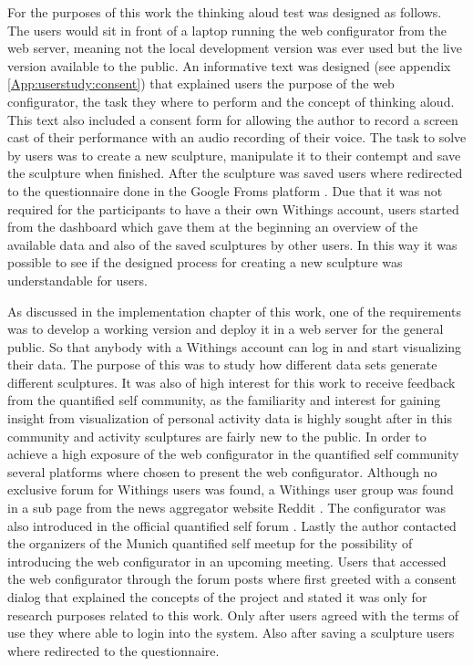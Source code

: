 \documentclass[../medieninformatik-arbeit.tex]{subfiles}
\begin{document}
For the purposes of this work the thinking aloud test was designed as follows. The users would sit in front of a laptop running the web configurator from the web server, meaning not the local development version was ever used but the live version available to the public. An informative text was designed (see appendix \ref{App:userstudy:consent}) that explained users the purpose of the web configurator, the task they where to perform and the concept of thinking aloud. This text also included a consent form for allowing the author to record a screen cast of their performance with an audio recording of their voice. The task to solve by users was to create a new sculpture, manipulate it to their contempt and save the sculpture when finished. After the sculpture was saved users where redirected to the questionnaire done in the Google Froms platform \cite{googleforms}. Due that it was not required for the participants to have a their own Withings account, users started from the dashboard which gave them at the beginning an overview of the available data and also of the saved sculptures by other users. In this way it was possible to see if the designed process for creating a new sculpture was understandable for users. 

As discussed in the implementation chapter of this work, one of the requirements was to develop a working version and deploy it in a web server for the general public. So that anybody with a Withings account can log in and start visualizing their data. The purpose of this was to study how different data sets generate different sculptures. It was also of high interest for this work to receive feedback from the quantified self community, as the familiarity and interest for gaining insight from visualization of personal activity data is highly sought after in this community and activity sculptures are fairly new to the public. In order to achieve a high exposure of the web configurator in the quantified self community several platforms where chosen to present the web configurator. Although no exclusive forum for Withings users was found, a Withings user group was found in a sub page from the news aggregator website Reddit \cite{redditwithings}. The configurator was also introduced in the official quantified self forum \cite{qfselfforum}. Lastly the author contacted the organizers of the Munich quantified self meetup \cite{qfselfmeetup} for the possibility of introducing the web configurator in an upcoming meeting. Users that accessed the web configurator through the forum posts where first greeted with a consent dialog that explained the concepts of the project and stated it was only for research purposes related to this work. Only after users agreed with the terms of use they where able to login into the system. Also after saving a sculpture users where redirected to the questionnaire. 
\end{document}
